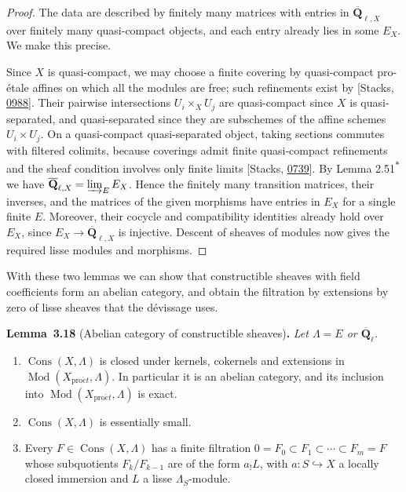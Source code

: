 \documentclass[11pt]{article}
\newenvironment{bpstatement}[2]{\par\addvspace{0.6\baselineskip}\noindent\textbf{#1}#2\textbf{.}\enspace\ignorespaces}
  {\par\addvspace{0.4\baselineskip}}
\newenvironment{bpstatementit}[2]{\begin{bpstatement}{#1}{#2}\itshape\ignorespaces}{\end{bpstatement}}
\newcommand{\bpout}[1]{#1\textsuperscript{\hyperlink{bp-outside}{\ensuremath{\ast}}}}
\providecommand{\Cons}{}\renewcommand{\Cons}{\operatorname{Cons}}
\providecommand{\QbarX}{}\renewcommand{\QbarX}{\overline{\mathbf Q}_{\ell,X}}
\begin{document}
\begin{proof}[{Proof}]\label{bp54}%
The data are described by finitely many matrices with entries in \(\QbarX\) over finitely many quasi-compact objects, and each entry already lies in some \(E_X\). We make this precise.

Since \(X\) is quasi-compact, we may choose a finite covering by quasi-compact pro-étale affines on which all the modules are free; such refinements exist by [Stacks, \href{https://stacks.math.columbia.edu/tag/0988}{0988}]. Their pairwise intersections \(U_i\times_XU_j\) are quasi-compact since \(X\) is quasi-separated, and quasi-separated since they are subschemes of the affine schemes \(U_i\times U_j\). On a quasi-compact quasi-separated object, taking sections commutes with filtered colimits, because coverings admit finite quasi-compact refinements and the sheaf condition involves only finite limits [Stacks, \href{https://stacks.math.columbia.edu/tag/0739}{0739}]. By Lemma \bpout{2.51} we have \(\QbarX=\varinjlim_EE_X\). Hence the finitely many transition matrices, their inverses, and the matrices of the given morphisms have entries in \(E_X\) for a single finite \(E\). Moreover, their cocycle and compatibility identities already hold over \(E_X\), since \(E_X\to\QbarX\) is injective. Descent of sheaves of modules now gives the required lisse modules and morphisms.
\end{proof}

\label{bp55}%
With these two lemmas we can show that constructible sheaves with field coefficients form an abelian category, and obtain the filtration by extensions by zero of lisse sheaves that the dévissage uses.

\label{bp56}%
\begin{bpstatementit}{Lemma~3.18}{ (Abelian category of constructible sheaves)}
Let \(\Lambda=E\) or \(\overline{\mathbf Q}_\ell\).

\begin{enumerate}
\item \(\Cons(X,\Lambda)\) is closed under kernels, cokernels and extensions in \(\operatorname{Mod}(X_{\mathrm{pro}\acute{e}t},\Lambda)\). In particular it is an abelian category, and its inclusion into \(\operatorname{Mod}(X_{\mathrm{pro}\acute{e}t},\Lambda)\) is exact.
\item \(\Cons(X,\Lambda)\) is essentially small.
\item Every \(F\in\Cons(X,\Lambda)\) has a finite filtration \(0=F_0\subset F_1\subset\cdots\subset F_m=F\) whose subquotients \(F_k/F_{k-1}\) are of the form \(a_!L\), with \(a:S\hookrightarrow X\) a locally closed immersion and \(L\) a lisse \(\Lambda_S\)-module.
\end{enumerate}
\end{bpstatementit}
\end{document}
